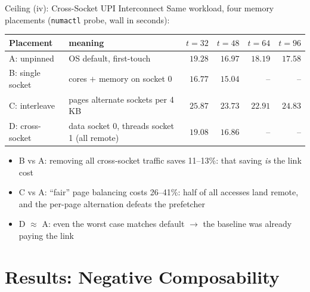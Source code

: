\documentclass[aspectratio=169,10pt]{beamer}
\newcommand{\good}[1]{\textcolor{green!50!black}{#1}}
\newcommand{\bad}[1]{\textcolor{red!70!black}{#1}}
\begin{document}
\begin{frame}{Ceiling (iv): Cross-Socket UPI Interconnect}
  Same workload, four memory placements (\texttt{numactl} probe, wall in seconds):
  \begin{center}
    \small
    \begin{tabular}{llrrrr}
      \toprule
      Placement & meaning & $t{=}32$ & $t{=}48$ & $t{=}64$ & $t{=}96$ \\
      \midrule
      A: unpinned & OS default, first-touch & $19.28$ & $16.97$ & $18.19$ & $17.58$ \\
      B: single socket & cores $+$ memory on socket 0 & \good{$\mathbf{16.77}$} & \good{$\mathbf{15.04}$} & -- & -- \\
      C: interleave & pages alternate sockets per 4\,KB & \bad{$25.87$} & \bad{$23.73$} & \bad{$22.91$} & \bad{$24.83$} \\
      D: cross-socket & data socket 0, threads socket 1 (all remote) & $19.08$ & $16.86$ & -- & -- \\
      \bottomrule
    \end{tabular}
  \end{center}
  \begin{itemize}
    \item B vs A: removing all cross-socket traffic saves \good{11--13\%}: that saving \emph{is} the link cost
    \item C vs A: ``fair'' page balancing costs \bad{26--41\%}: half of all accesses land remote, and the per-page alternation defeats the prefetcher
    \item D $\approx$ A: even the worst case matches default $\to$ the baseline was already paying the link
  \end{itemize}
\end{frame}

\section{Results: Negative Composability}
\end{document}
